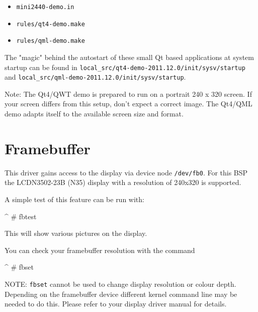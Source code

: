 \begin{itemize}
	\item \texttt{mini2440-demo.in}
	\item \texttt{rules/qt4-demo.make}
	\item \texttt{rules/qml-demo.make}
\end{itemize}

The "magic" behind the autostart of these small Qt based applications at system
startup can be found in \texttt{local\_src/qt4-demo-2011.12.0/init/sysv/startup}
and \texttt{local\_src/qml-demo-2011.12.0/init/sysv/startup}.

Note: The Qt4/QWT demo is prepared to run on a portrait 240 x 320 screen. If
your screen differs from this setup, don't expect a correct image. The Qt4/QML
demo adapts itself to the available screen size and format.


\newcommand{\perDisplayName}{LCDN3502-23B (N35)}
\newcommand{\perDisplayRes}{240x320}

\section{Framebuffer}					\label{sec:fb}

This driver gains access to the display via device node \texttt{/dev/fb0}.
For this BSP the \perDisplayName{} display with a resolution of
\perDisplayRes{} is supported.

A simple test of this feature can be run with:

\begin{ptxshell}[escapechar=|]{^}
# fbtest
\end{ptxshell}

This will show various pictures on the display.

You can check your framebuffer resolution with the command
\begin{ptxshell}[escapechar=|]{^}
# fbset
\end{ptxshell}

NOTE: \texttt{fbset} cannot be used to change display resolution or colour depth.
Depending on the framebuffer device different kernel command line may be needed
to do this. Please refer to your display driver manual for details.


